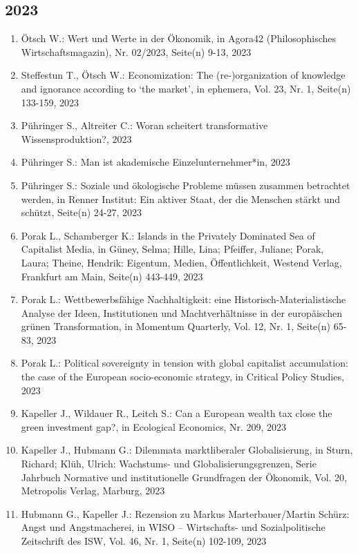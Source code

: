 \subsection*{2023}
\begin{enumerate}
    	 \item Ötsch W.: Wert und Werte in der Ökonomik, in Agora42 (Philosophisches Wirtschaftsmagazin), Nr. 02/2023, Seite(n) 9-13, 2023
	 \item Steffestun T., Ötsch W.: Economization: The (re-)organization of knowledge and ignorance according to ‘the market’, in ephemera, Vol. 23, Nr. 1, Seite(n) 133-159, 2023
	 \item Pühringer S., Altreiter C.: Woran scheitert transformative Wissensproduktion?, 2023
	 \item Pühringer S.: Man ist akademische Einzelunternehmer*in, 2023
	 \item Pühringer S.: Soziale und ökologische Probleme müssen zusammen betrachtet werden, in Renner Institut: Ein aktiver Staat, der die Menschen stärkt und schützt, Seite(n) 24-27, 2023
	 \item Porak L., Schamberger K.: Islands in the Privately Dominated Sea of Capitalist Media, in Güney, Selma; Hille, Lina; Pfeiffer, Juliane; Porak, Laura; Theine, Hendrik: Eigentum, Medien, Öffentlichkeit, Westend Verlag, Frankfurt am Main, Seite(n) 443-449, 2023
	 \item Porak L.: Wettbewerbsfähige Nachhaltigkeit: eine Historisch-Materialistische Analyse der Ideen, Institutionen und Machtverhältnisse in der europäischen grünen Transformation, in Momentum Quarterly, Vol. 12, Nr. 1, Seite(n) 65-83, 2023
	 \item Porak L.: Political sovereignty in tension with global capitalist accumulation: the case of the European socio-economic strategy, in Critical Policy Studies, 2023
	 \item Kapeller J., Wildauer R., Leitch S.: Can a European wealth tax close the green investment gap?, in Ecological Economics, Nr. 209, 2023
	 \item Kapeller J., Hubmann G.: Dilemmata marktliberaler Globalisierung, in Sturn, Richard; Klüh, Ulrich: Wachstums- und Globalisierungsgrenzen, Serie Jahrbuch Normative und institutionelle Grundfragen der Ökonomik, Vol. 20, Metropolis Verlag, Marburg, 2023
	 \item Hubmann G., Kapeller J.: Rezension zu Markus Marterbauer/Martin Schürz: Angst und Angstmacherei, in WISO – Wirtschafts- und Sozialpolitische Zeitschrift des ISW, Vol. 46, Nr. 1, Seite(n) 102-109, 2023

\end{enumerate}
